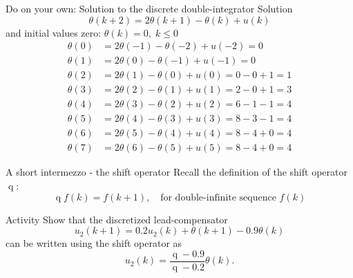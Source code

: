 \documentclass[presentation,aspectratio=1610]{beamer}
\DeclareMathOperator{\shift}{q}
\begin{document}
\begin{frame}[label={sec:org069f132}]{Do on your own: Solution to the discrete double-integrator}
\alert{Solution}
\footnotesize
\[ \theta(k+2) =  2\theta(k+1) - \theta(k) + u(k)\]
and initial values zero: \( \theta(k) = 0, \; k \le 0 \) 
\begin{align*}
 \theta(0) &=  2\theta(-1) - \theta(-2) + u(-2) = 0\\
 \theta(1) &=  2\theta(0) - \theta(-1) + u(-1) = 0\\
 \theta(2) &=  2\theta(1) - \theta(0) + u(0) = 0 - 0 + 1 = 1\\
 \theta(3) &=  2\theta(2) - \theta(1) + u(1) = 2 - 0 + 1 = 3\\
 \theta(4) &=  2\theta(3) - \theta(2) + u(2) = 6 - 1 - 1 = 4\\
 \theta(5) &=  2\theta(4) - \theta(3) + u(3) = 8 - 3 - 1 = 4\\
 \theta(6) &=  2\theta(5) - \theta(4) + u(4) = 8 - 4 +0= 4\\
 \theta(7) &=  2\theta(6) - \theta(5) + u(5) = 8 - 4 +0= 4
 \end{align*}
   \begin{center}
   \end{center}
\end{frame}

\begin{frame}[label={sec:org20ba333}]{A short intermezzo - the shift operator}
Recall the definition of the shift operator \(\shift\):
\[ \shift f(k) = f(k+1), \quad \text{for double-infinite sequence $f(k)$} \]

\alert{Activity} Show that the discretized lead-compensator
\[ u_2(k+1) = 0.2u_2(k) + \theta(k+1) - 0.9\theta(k)\]
can be written using the shift operator as 
\[ u_2(k) = \frac{\shift -0.9}{\shift - 0.2} \theta(k).\]
\end{frame}
\end{document}
